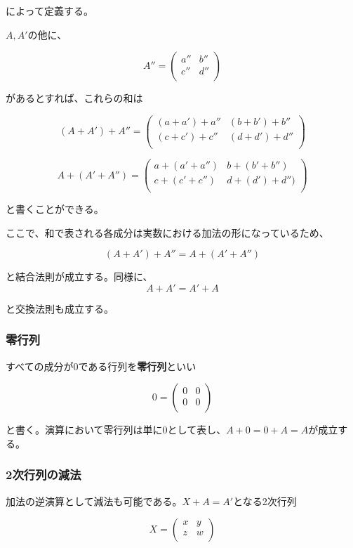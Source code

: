 \documentclass[dvipdfmx,autodetect-engine]{jsarticle}
\begin{document}
によって定義する。

$A,A'$の他に、

$$
A'' = \begin{pmatrix}
a'' & b'' \\
c'' & d'' \\
\end{pmatrix}
$$

があるとすれば、これらの和は

$$
(A + A') + A'' = \begin{pmatrix}
(a + a') + a'' & (b + b') + b'' \\
(c + c') + c'' & (d + d') + d'' \\
\end{pmatrix}
$$

$$
A + (A' + A'') = \begin{pmatrix}
a + (a' + a'') & b + (b' + b'') \\
c + (c' + c'') & d + (d') + d'') \\
\end{pmatrix}
$$

と書くことができる。

ここで、和で表される各成分は実数における加法の形になっているため、

$$
(A + A') + A'' = A + (A' + A'')
$$

と結合法則が成立する。同様に、
$$
A + A' = A' + A
$$

と交換法則も成立する。

\subsubsection{零行列}

すべての成分が0である行列を{\bf 零行列}といい

$$
0 = \begin{pmatrix}
0 & 0 \\
0 & 0 \\
\end{pmatrix}
$$

と書く。演算において零行列は単に$0$として表し、$A + 0 = 0 + A = A$が成立する。

\subsubsection{2次行列の減法}

加法の逆演算として減法も可能である。$X + A = A'$となる2次行列

$$
X = \begin{pmatrix}
x & y \\
z & w \\
\end{pmatrix}
$$
\end{document}
